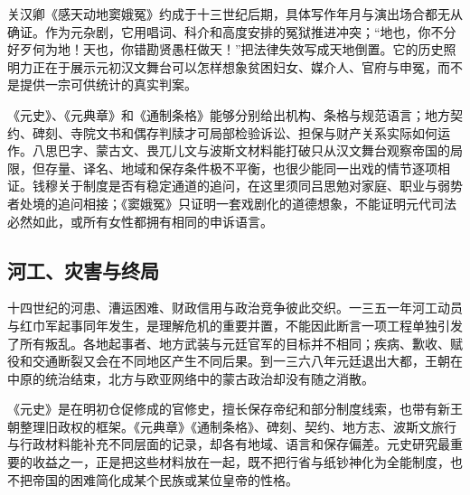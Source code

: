 关汉卿《感天动地窦娥冤》约成于十三世纪后期，具体写作年月与演出场合都无从确证。作为元杂剧，它用唱词、科介和高度安排的冤狱推进冲突；“地也，你不分好歹何为地！天也，你错勘贤愚枉做天！”把法律失效写成天地倒置。它的历史照明力正在于展示元初汉文舞台可以怎样想象贫困妇女、媒介人、官府与申冤，而不是提供一宗可供统计的真实判案。

《元史》、《元典章》和《通制条格》能够分别给出机构、条格与规范语言；地方契约、碑刻、寺院文书和偶存判牍才可局部检验诉讼、担保与财产关系实际如何运作。八思巴字、蒙古文、畏兀儿文与波斯文材料能打破只从汉文舞台观察帝国的局限，但存量、译名、地域和保存条件极不平衡，也很少能同一出戏的情节逐项相证。钱穆关于制度是否有稳定通道的追问，在这里须同吕思勉对家庭、职业与弱势者处境的追问相接；《窦娥冤》只证明一套戏剧化的道德想象，不能证明元代司法必然如此，或所有女性都拥有相同的申诉语言。

\subsection{河工、灾害与终局}

十四世纪的河患、漕运困难、财政信用与政治竞争彼此交织。一三五一年河工动员与红巾军起事同年发生，是理解危机的重要并置，不能因此断言一项工程单独引发了所有叛乱。各地起事者、地方武装与元廷官军的目标并不相同；疾病、歉收、赋役和交通断裂又会在不同地区产生不同后果。到一三六八年元廷退出大都，王朝在中原的统治结束，北方与欧亚网络中的蒙古政治却没有随之消散。

《元史》是在明初仓促修成的官修史，擅长保存帝纪和部分制度线索，也带有新王朝整理旧政权的框架。《元典章》《通制条格》、碑刻、契约、地方志、波斯文旅行与行政材料能补充不同层面的记录，却各有地域、语言和保存偏差。元史研究最重要的收益之一，正是把这些材料放在一起，既不把行省与纸钞神化为全能制度，也不把帝国的困难简化成某个民族或某位皇帝的性格。
